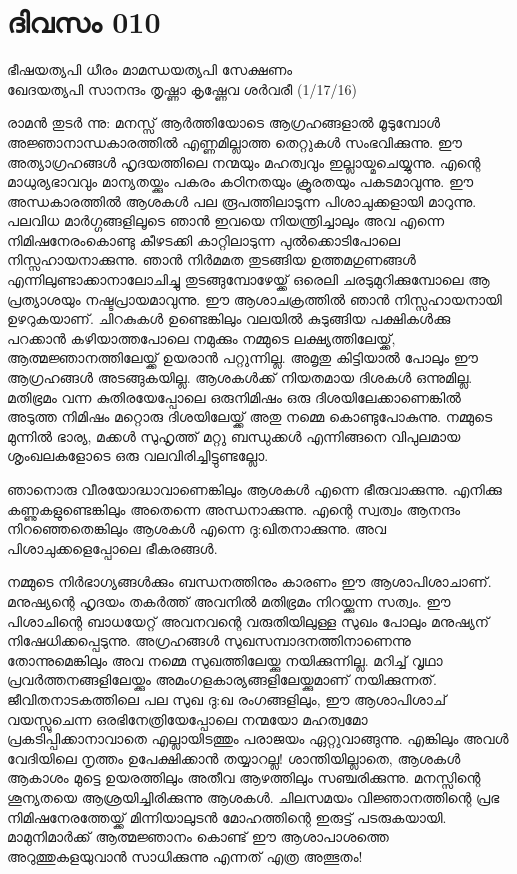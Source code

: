 \newpage
\section{ദിവസം 010}

\begin{center}
ഭീഷയത്യപി ധീരം മാമന്ധയത്യപി സേക്ഷണം\\
ഖേദയത്യപി സാനന്ദം തൃഷ്ണാ കൃഷ്ണേവ ശർവരീ (1/17/16)\\ 
\end{center}

രാമന്‍ തുടര്‍ ന്നു: മനസ്സ്‌ ആര്‍ത്തിയോടെ ആഗ്രഹങ്ങളാല്‍ മൂടുമ്പോള്‍ അജ്ഞാനാന്ധകാരത്തില്‍ എണ്ണമില്ലാത്ത തെറ്റുകള്‍ സംഭവിക്കുന്നു. ഈ അത്യാഗ്രഹങ്ങള്‍ ഹൃദയത്തിലെ നന്മയും മഹത്വവും ഇല്ലായ്മചെയ്യുന്നു. എന്റെ മാധുര്യഭാവവും മാന്യതയ്ക്കും പകരം കഠിനതയും ക്രൂരതയും പകടമാവുന്നു. ഈ അന്ധകാരത്തില്‍ ആശകള്‍ പല രൂപത്തിലാടുന്ന പിശാചുക്കളായി മാറുന്നു. പലവിധ മാര്‍ഗ്ഗങ്ങളിലൂടെ ഞാന്‍ ഇവയെ നിയന്ത്രിച്ചാലും അവ എന്നെ നിമിഷനേരംകൊണ്ടു കീഴടക്കി കാറ്റിലാടുന്ന പുല്‍ക്കൊടിപോലെ നിസ്സഹായനാക്കുന്നു. ഞാന്‍ നിര്‍മമത തുടങ്ങിയ ഉത്തമഗുണങ്ങള്‍ എന്നിലുണ്ടാക്കാനാലോചിച്ചു തുടങ്ങുമ്പോഴേയ്ക്ക്‌ ഒരെലി ചരടുമുറിക്കുമ്പോലെ ആ പ്രത്യാശയും നഷ്ടപ്രായമാവുന്നു. ഈ ആശാചക്രത്തില്‍ ഞാന്‍ നിസ്സഹായനായി ഉഴറുകയാണ്‌. ചിറകുകള്‍ ഉണ്ടെങ്കിലും വലയില്‍ കുടുങ്ങിയ പക്ഷികള്‍ക്കു പറക്കാന്‍ കഴിയാത്തപോലെ നമുക്കും നമ്മുടെ ലക്ഷ്യത്തിലേയ്ക്ക്, ആത്മജ്ഞാനത്തിലേയ്ക്ക്‌ ഉയരാന്‍ പറ്റുന്നില്ല. അമൃതു കിട്ടിയാല്‍ പോലും ഈ ആഗ്രഹങ്ങള്‍ അടങ്ങുകയില്ല. ആശകള്‍ക്ക്‌ നിയതമായ ദിശകള്‍ ഒന്നുമില്ല. മതിഭ്രമം വന്ന കുതിരയേപ്പോലെ ഒരുനിമിഷം ഒരു ദിശയിലേക്കാണെങ്കില്‍ അടുത്ത നിമിഷം മറ്റൊരു ദിശയിലേയ്ക്ക്‌ അതു നമ്മെ കൊണ്ടുപോകുന്നു. നമ്മുടെ മുന്നില്‍ ഭാര്യ, മക്കള്‍ സുഹൃത്ത്‌ മറ്റു ബന്ധുക്കള്‍ എന്നിങ്ങനെ വിപുലമായ ശൃംഖലകളോടെ ഒരു വലവിരിച്ചിട്ടുണ്ടല്ലോ.

ഞാനൊരു വീരയോദ്ധാവാണെങ്കിലും ആശകള്‍ എന്നെ ഭീരുവാക്കുന്നു.
എനിക്കു കണ്ണുകളുണ്ടെങ്കിലും അതെന്നെ അന്ധനാക്കുന്നു.
എന്റെ സ്വത്വം ആനന്ദം നിറഞ്ഞെതെങ്കിലും ആശകള്‍ എന്നെ ദു:ഖിതനാക്കുന്നു.
അവ പിശാചുക്കളെപ്പോലെ ഭീകരങ്ങള്‍. 

നമ്മുടെ നിര്‍ഭാഗ്യങ്ങള്‍ക്കും ബന്ധനത്തിനും കാരണം ഈ ആശാപിശാചാണ്‌. മനുഷ്യന്റെ ഹൃദയം തകര്‍ത്ത്‌ അവനില്‍ മതിഭ്രമം നിറയ്ക്കുന്ന സത്വം. ഈ പിശാചിന്റെ ബാധയേറ്റ്‌ അവനവന്റെ വരുതിയിലുള്ള സുഖം പോലും മനുഷ്യന്‌ നിഷേധിക്കപ്പെടുന്നു. അഗ്രഹങ്ങള്‍ സുഖസമ്പാദനത്തിനാണെന്നു തോന്നുമെങ്കിലും അവ നമ്മെ സുഖത്തിലേയ്ക്കു നയിക്കുന്നില്ല. മറിച്ച്‌ വൃഥാ പ്രവര്‍ത്തനങ്ങളിലേയ്ക്കും അമംഗളകാര്യങ്ങളിലേയ്ക്കുമാണ്‌ നയിക്കുന്നത്‌. ജീവിതനാടകത്തിലെ പല സുഖ ദു:ഖ രംഗങ്ങളിലും, ഈ ആശാപിശാച്‌ വയസ്സുചെന്ന ഒരഭിനേത്രിയേപ്പോലെ നന്മയോ മഹത്വമോ പ്രകടിപ്പിക്കാനാവാതെ എല്ലായിടത്തും പരാജയം ഏറ്റുവാങ്ങുന്നു. എങ്കിലും അവള്‍ വേദിയിലെ നൃത്തം ഉപേക്ഷിക്കാന്‍ തയ്യാറല്ല! ശാന്തിയില്ലാതെ, ആശകള്‍ ആകാശം മുട്ടെ ഉയരത്തിലും അതീവ ആഴത്തിലും സഞ്ചരിക്കുന്നു. മനസ്സിന്റെ ശൂന്യതയെ ആശ്രയിച്ചിരിക്കുന്നു ആശകള്‍. ചിലസമയം വിജ്ഞാനത്തിന്റെ പ്രഭ നിമിഷനേരത്തേയ്ക്ക്‌ മിന്നിയാലുടന്‍ മോഹത്തിന്റെ ഇരുട്ട്‌ പടരുകയായി. മാമുനിമാര്‍ക്ക്‌ ആത്മജ്ഞാനം കൊണ്ട്‌ ഈ ആശാപാശത്തെ അറുത്തുകളയുവാന്‍ സാധിക്കുന്നു എന്നത്‌ എത്ര അത്ഭുതം!
